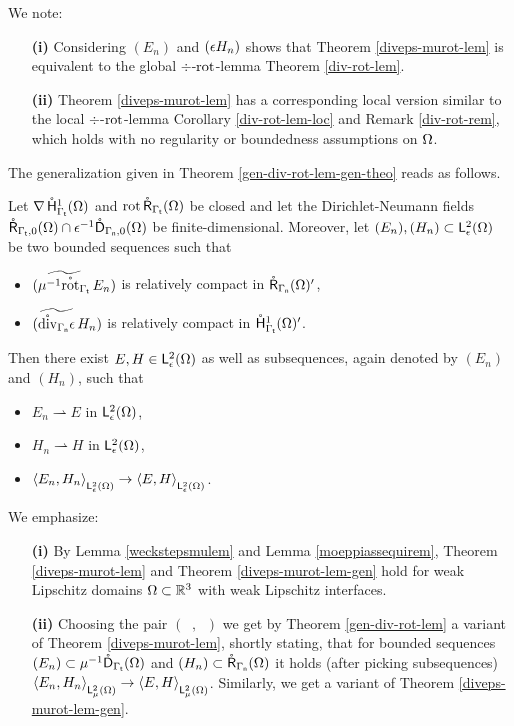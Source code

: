 \documentclass[a4paper]{amsart}
\newcommand{\wto}{\rightharpoonup}
\DeclareMathOperator{\Ao}{A_{1}}
\DeclareMathOperator{\At}{A_{2}}
\renewcommand{\rotc}{\mathring\rot}
\renewcommand{\divc}{\mathring\div}
\begin{document}
\begin{rem}
We note:
\begin{itemize}
\item[\bf(i)]
Considering $(E_{n})$ and $(\epsilon H_{n})$ shows that Theorem \ref{diveps-murot-lem} 
is equivalent to the global $\div$-$\operatorname{rot}$-lemma Theorem \ref{div-rot-lem}.
\item[\bf(ii)]
Theorem \ref{diveps-murot-lem} has a corresponding local version similar to 
the local $\div$-$\operatorname{rot}$-lemma Corollary \ref{div-rot-lem-loc} and Remark \ref{div-rot-rem}, 
which holds with no regularity or boundedness assumptions on $\Omega$.
\end{itemize}
\end{rem}

The generalization given in Theorem \ref{gen-div-rot-lem-gen-theo} reads as follows.

\begin{theo}
Let $\operatorname{\nabla}\mathring{\mathsf{H}}^{1}_{\Gamma_{\mathsf{t}}}(\Omega)$ and $\operatorname{rot}\mathring{\mathsf{R}}_{\Gamma_{\mathsf{t}}}(\Omega)$ be closed and let the Dirichlet-Neumann fields
$\mathring{\mathsf{R}}_{\Gamma_{\mathsf{t}},0}(\Omega)\cap\epsilon^{-1}\mathring{\mathsf{D}}_{\Gamma_{\mathsf{n}},0}(\Omega)$ be finite-dimensional.
Moreover, let $(E_{n}),(H_{n})\subset\overset{}{\mathsf{L}}{}^{2}_{\epsilon}(\Omega)$ be two bounded sequences such that
\begin{itemize}
\item
$(\widetilde{\mu^{-1}\rotc_{\gat}}\,E_{n})$ is relatively compact in $\mathring{\mathsf{R}}_{\Gamma_{\mathsf{n}}}(\Omega)'$,
\item
$(\widetilde{\divc_{\gan}\eps}\,H_{n})$ is relatively compact in $\mathring{\mathsf{H}}^{1}_{\Gamma_{\mathsf{t}}}(\Omega)'$.
\end{itemize}
Then there exist $E,H\in\overset{}{\mathsf{L}}{}^{2}_{\epsilon}(\Omega)$ as well as subsequences, again denoted by $(E_{n})$ and $(H_{n})$, 
such that
\begin{itemize}
\item
$E_{n}\wto E$ in $\overset{}{\mathsf{L}}{}^{2}_{\epsilon}(\Omega)$,
\item
$H_{n}\wto H$ in $\overset{}{\mathsf{L}}{}^{2}_{\epsilon}(\Omega)$,
\item
$\langle E_{n},H_{n}\rangle_{\overset{}{\mathsf{L}}{}^{2}_{\epsilon}(\Omega)}\to\langle E,H\rangle_{\overset{}{\mathsf{L}}{}^{2}_{\epsilon}(\Omega)}$.
\end{itemize}
\end{theo}

\begin{rem}
We emphasize:
\begin{itemize}
\item[\bf(i)]
By Lemma \ref{weckstepsmulem} and Lemma \ref{moeppiassequirem}, 
Theorem \ref{diveps-murot-lem} and Theorem \ref{diveps-murot-lem-gen} hold
for weak Lipschitz domains $\Omega\subset\mathbb{R}^{3}$ with weak Lipschitz interfaces.
\item[\bf(ii)]
Choosing the pair $(\Ao,\At)$ we get by Theorem \ref{gen-div-rot-lem}
a variant of Theorem \ref{diveps-murot-lem}, shortly stating, that for bounded sequences 
$(E_{n})\subset\mu^{-1}\mathring{\mathsf{D}}_{\Gamma_{\mathsf{t}}}(\Omega)$ and $(H_{n})\subset\mathring{\mathsf{R}}_{\Gamma_{\mathsf{n}}}(\Omega)$ it holds (after picking subsequences)
$\langle E_{n},H_{n}\rangle_{\overset{}{\mathsf{L}}{}^{2}_{\mu}(\Omega)}\to\langle E,H\rangle_{\overset{}{\mathsf{L}}{}^{2}_{\mu}(\Omega)}$.
Similarly, we get a variant of Theorem \ref{diveps-murot-lem-gen}.
\end{itemize}
\end{rem}
\end{document}
